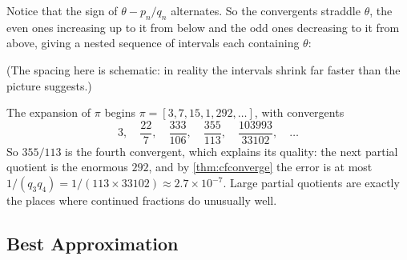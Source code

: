 Notice that the sign of $\theta - p_n/q_n$ alternates. So the convergents straddle $\theta$, the even ones increasing up to it from below and the odd ones decreasing to it from above, giving a nested sequence of intervals each containing $\theta$:

\begin{center}
\end{center}

(The spacing here is schematic: in reality the intervals shrink far faster than the picture suggests.)

\begin{example}
	The expansion of $\pi$ begins $\pi = [3, 7, 15, 1, 292, \dots]$, with convergents
	$$
	3, \quad \frac{22}7, \quad \frac{333}{106}, \quad \frac{355}{113}, \quad \frac{103993}{33102}, \quad \dots
	$$
	So $355/113$ is the fourth convergent, which explains its quality: the next partial quotient is the enormous $292$, and by \autoref{thm:cfconverge} the error is at most $1/(q_3q_4) = 1/(113 \times 33102) \approx 2.7\times10^{-7}$. Large partial quotients are exactly the places where continued fractions do unusually well.
\end{example}

\subsection{Best Approximation}

